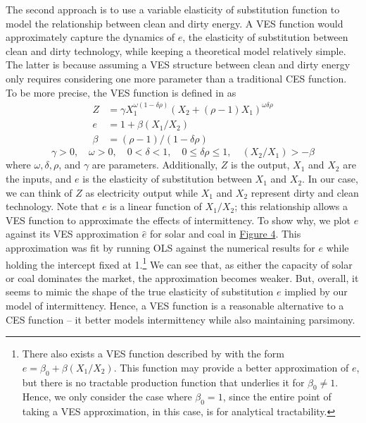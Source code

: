 \documentclass[11pt,a4paper]{extarticle}
\begin{document}
The second approach is to use a variable elasticity of substitution function to model the relationship between clean and dirty energy.  A VES function would approximately capture the dynamics of $e$, the elasticity of substitution between clean and dirty technology,  while keeping a theoretical model relatively simple. The latter is because assuming a VES structure between clean and dirty energy only requires considering one more parameter than a traditional CES function. To be more precise, the VES function is defined in \citet{VES} as
\begin{align}
Z &= \gamma X_1^{\omega(1-\delta \rho)} \left( X_2 + (\rho - 1) X_1 \right)^{\omega \delta \rho} \\
e &= 1 + \beta (X_1 / X_2) \\
\beta &= (\rho - 1) / ( 1- \delta \rho ) 
\end{align}
\vspace{-4ex}
$$\gamma > 0, \quad \omega > 0, \quad0 < \delta < 1, \quad 0 \leq \delta \rho \leq 1 , \quad (X_2/X_1) >  -\beta $$
where $\omega, \delta, \rho$, and $\gamma$ are parameters. Additionally, $Z$ is the output, $X_1$ and $X_2$ are the inputs, and $e$ is the elasticity of substitution between $X_1$ and $X_2$. In our case, we can think of $Z$ as electricity output while $X_1$ and $X_2$ represent dirty and clean technology. Note that $e$ is a linear function of $X_1/X_2$; this relationship allows a VES function to approximate the effects of intermittency. To show why, we plot $e$ against its VES approximation $\hat{e}$ for solar and coal in \hyperref[fig:ves]{Figure 4}. This approximation was fit by running OLS against the numerical results for $e$ while holding the intercept fixed at 1.\footnote{ There also exists a VES function described by \citet{VES} with the form $e = \beta_0 + \beta (X_1/X_2)$. This function may provide a better approximation of $e$, but there is no tractable production function that underlies it for $\beta_0 \neq 1$. Hence, we only consider the case where $\beta_0 = 1$, since the entire point of taking a VES approximation, in this case, is for analytical tractability. } We can see that, as either the capacity of solar or coal dominates the market, the approximation becomes weaker. But, overall, it seems to mimic the shape of the true elasticity of substitution $e$ implied by our model of intermittency. Hence, a  VES function is a reasonable alternative to a CES function -- it better models intermittency while also maintaining parsimony. 
\end{document}

